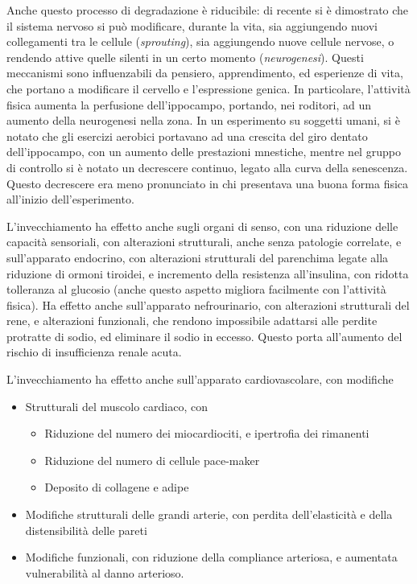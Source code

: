 Anche questo processo di degradazione è riducibile: di recente si è dimostrato 
che il sistema nervoso si può modificare, durante la vita, sia aggiungendo 
nuovi collegamenti tra le cellule (\textit{sprouting}), sia aggiungendo nuove 
cellule nervose, o rendendo attive quelle silenti in un certo momento 
(\textit{neurogenesi}). Questi meccanismi sono influenzabili da pensiero, 
apprendimento, ed esperienze di vita, che portano a modificare il cervello e 
l'espressione genica. In particolare, l'attività fisica aumenta la perfusione 
dell'ippocampo, portando, nei roditori, ad un aumento della neurogenesi nella 
zona. In un esperimento su soggetti umani, si è notato che gli esercizi 
aerobici portavano ad una crescita del giro dentato dell'ippocampo, con un 
aumento delle prestazioni mnestiche, mentre nel gruppo di controllo si è notato 
un decrescere continuo, legato alla curva della senescenza. Questo decrescere 
era meno pronunciato in chi presentava una buona forma fisica all'inizio 
dell'esperimento.

L'invecchiamento ha effetto anche sugli organi di senso, con una riduzione 
delle capacità sensoriali, con alterazioni strutturali, anche senza patologie 
correlate, e sull'apparato endocrino, con alterazioni strutturali del 
parenchima legate alla riduzione di ormoni tiroidei, e incremento della 
resistenza all'insulina, con ridotta tolleranza al glucosio (anche questo 
aspetto migliora facilmente con l'attività fisica). Ha effetto anche 
sull'apparato nefrourinario, con alterazioni strutturali del rene, e 
alterazioni funzionali, che rendono impossibile adattarsi alle perdite 
protratte di sodio, ed eliminare il sodio in eccesso. Questo porta all'aumento 
del rischio di insufficienza renale acuta.

L'invecchiamento ha effetto anche sull'apparato cardiovascolare, con modifiche
\begin{itemize}
 \item Strutturali del muscolo cardiaco, con
 \begin{itemize}
  \item Riduzione del numero dei miocardiociti, e ipertrofia dei rimanenti
  \item Riduzione del numero di cellule pace-maker
  \item Deposito di collagene e adipe
 \end{itemize}
 \item Modifiche strutturali delle grandi arterie, con perdita dell'elasticità 
e della distensibilità delle pareti
 \item Modifiche funzionali, con riduzione della compliance arteriosa, e 
aumentata vulnerabilità al danno arterioso.
\end{itemize}

